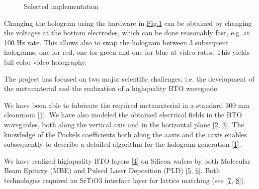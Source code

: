 \documentclass[a4paper,10pt,english,openany,oneside]{jupyterBook}
\begin{document}
\begin{figure}[htbp]
\centering
\capstart

\noindent{}
\caption{Selected implementation}\label{\detokenize{intro2:selectedimplementation}}\end{figure}

\sphinxAtStartPar
Changing the hologram using the hardware in \hyperref[\detokenize{intro2:selectedimplementation}]{Fig.\@ \ref{\detokenize{intro2:selectedimplementation}}} can be obtained by changing the voltages at the bottom electrodes, which can be done reasonably fast, e.g. at 100 Hz rate. This allows also to swap the hologram between 3 subsequent holograms, one for red, one for green and one for blue at video rates. This yields full color video holography.

\begin{DUlineblock}{0em}
\item[] 
\end{DUlineblock}

\sphinxAtStartPar
The project has focused on two major scientific challenges, i.e. the development of the metamaterial and the realization of a high\sphinxhyphen{}quality BTO waveguide.

\begin{DUlineblock}{0em}
\item[] 
\end{DUlineblock}

\sphinxAtStartPar
We have been able to fabricate the required metamaterial in a standard 300 mm cleanroom {[}\hyperlink{cite.bib:id7}{1}{]}. We have also modeled the obtained electrical fields in the BTO waveguides, both along the vertical axis and in the horizontal plane {[}\hyperlink{cite.bib:id6}{2}, \hyperlink{cite.bib:id4}{3}{]}. The knowledge of the Pockels coefficients both along the a\sphinxhyphen{}axis and the c\sphinxhyphen{}axis enables subsequently to describe a detailed algorithm for the hologram generation {[}\hyperlink{cite.bib:id7}{1}{]}.

\begin{DUlineblock}{0em}
\item[] 
\end{DUlineblock}

\sphinxAtStartPar
We have realized high\sphinxhyphen{}quality BTO layers {[}\hyperlink{cite.bib:id8}{4}{]} on Silicon wafers by both Molecular Beam Epitaxy (MBE) and Pulsed Laser Deposition (PLD) {[}\hyperlink{cite.bib:id11}{5}, \hyperlink{cite.bib:id13}{6}{]}. Both technologies required an SrTiO3 interface layer for lattice matching (see {[}\hyperlink{cite.bib:id10}{7}, \hyperlink{cite.bib:id9}{8}{]}).
\end{document}
